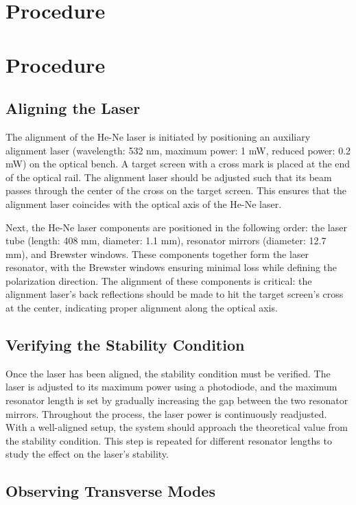 \section{Procedure}

\section{Procedure}

\subsection{Aligning the Laser}

The alignment of the He-Ne laser is initiated by positioning an auxiliary alignment laser (wavelength: 532 nm, maximum power: 1 mW, reduced power: 0.2 mW) on the optical bench. A target screen with a cross mark is placed at the end of the optical rail. The alignment laser should be adjusted such that its beam passes through the center of the cross on the target screen. This ensures that the alignment laser coincides with the optical axis of the He-Ne laser.

Next, the He-Ne laser components are positioned in the following order: the laser tube (length: 408 mm, diameter: 1.1 mm), resonator mirrors (diameter: 12.7 mm), and Brewster windows. These components together form the laser resonator, with the Brewster windows ensuring minimal loss while defining the polarization direction. The alignment of these components is critical: the alignment laser's back reflections should be made to hit the target screen's cross at the center, indicating proper alignment along the optical axis.

\subsection{Verifying the Stability Condition}

Once the laser has been aligned, the stability condition must be verified. The laser is adjusted to its maximum power using a photodiode, and the maximum resonator length is set by gradually increasing the gap between the two resonator mirrors. Throughout the process, the laser power is continuously readjusted. With a well-aligned setup, the system should approach the theoretical value from the stability condition. This step is repeated for different resonator lengths to study the effect on the laser's stability.

\subsection{Observing Transverse Modes}

